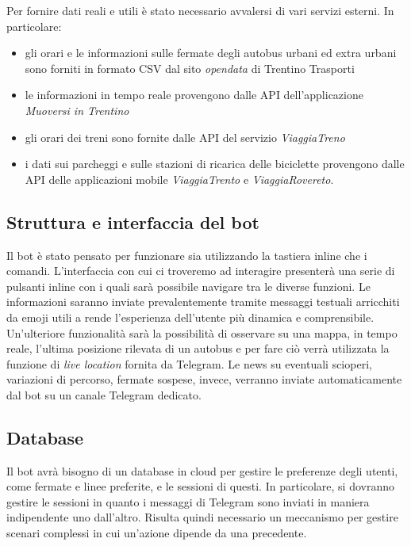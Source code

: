 Per fornire dati reali e utili è stato necessario avvalersi di vari servizi esterni. In particolare: 
\begin{itemize}
\item gli orari e le informazioni sulle fermate degli autobus urbani ed extra urbani sono forniti in formato CSV dal sito \textit{opendata} di Trentino Trasporti \cite{opendataTrentinoTrasporti}
\item le informazioni in tempo reale provengono dalle API dell'applicazione \textit{Muoversi in Trentino}
\item gli orari dei treni sono fornite dalle API del servizio \textit{ViaggiaTreno}
\item i dati sui parcheggi e sulle stazioni di ricarica delle biciclette provengono dalle API delle applicazioni mobile \textit{ViaggiaTrento} e \textit{ViaggiaRovereto}.
\end{itemize}

\subsection{Struttura e interfaccia del bot}
Il bot è stato pensato per funzionare sia utilizzando la tastiera inline che i comandi. 
L'interfaccia con cui ci troveremo ad interagire presenterà una serie di pulsanti inline con i quali sarà possibile navigare tra le diverse funzioni. Le informazioni saranno inviate prevalentemente tramite messaggi testuali arricchiti da emoji utili a rende l'esperienza dell'utente più dinamica e comprensibile. 
Un'ulteriore funzionalità sarà la possibilità di osservare su una mappa, in tempo reale, l'ultima posizione rilevata di un autobus e per fare ciò verrà utilizzata la funzione di \textit{live location} fornita da Telegram. 
Le news su eventuali scioperi, variazioni di percorso, fermate sospese, invece, verranno inviate automaticamente dal bot su un canale Telegram dedicato. 

\subsection{Database}
Il bot avrà bisogno di un database in cloud per gestire le preferenze degli utenti, come fermate e linee preferite, e le sessioni di questi. In particolare, si dovranno gestire le sessioni in quanto i messaggi di Telegram sono inviati in maniera indipendente uno dall'altro. Risulta quindi necessario un meccanismo per gestire scenari complessi in cui un'azione dipende da una precedente. 

